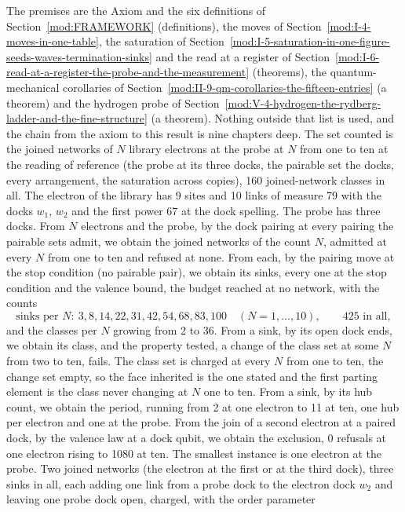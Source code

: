 \begin{chproof}[census]
The premises are the Axiom and the six definitions of Section~\ref{mod:FRAMEWORK} (definitions), the moves of Section~\ref{mod:I-4-moves-in-one-table}, the saturation of Section~\ref{mod:I-5-saturation-in-one-figure-seeds-waves-termination-sinks} and the read at a register of Section~\ref{mod:I-6-read-at-a-register-the-probe-and-the-measurement} (theorems), the quantum-mechanical corollaries of Section~\ref{mod:II-9-qm-corollaries-the-fifteen-entries} (a theorem) and the hydrogen probe of Section~\ref{mod:V-4-hydrogen-the-rydberg-ladder-and-the-fine-structure} (a theorem). Nothing outside that list is used, and the chain from the axiom to this result is nine chapters deep.
The set counted is the joined networks of $N$ library electrons at the probe at $N$ from one to ten at the reading of reference (the probe at its three docks, the pairable set the docks, every arrangement, the saturation across copies), 160 joined-network classes in all. The electron of the library has 9 sites and 10 links of measure 79 with the docks $w_1$, $w_2$ and the first power 67 at the dock spelling. The probe has three docks. From $N$ electrons and the probe, by the dock pairing at every pairing the pairable sets admit, we obtain the joined networks of the count $N$, admitted at every $N$ from one to ten and refused at none. From each, by the pairing move at the stop condition (no pairable pair), we obtain its sinks, every one at the stop condition and the valence bound, the budget reached at no network, with the counts
\begin{equation}
\text{sinks per } N: \ 3, 8, 14, 22, 31, 42, 54, 68, 83, 100 \quad (N = 1, \ldots, 10), \qquad 425 \text{ in all} ,
\end{equation}
and the classes per $N$ growing from 2 to 36. From a sink, by its open dock ends, we obtain its class, and the property tested, a change of the class set at some $N$ from two to ten, fails. The class set is charged at every $N$ from one to ten, the change set empty, so the face inherited is the one stated and the first parting element is the class never changing at $N$ one to ten. From a sink, by its hub count, we obtain the period, running from 2 at one electron to 11 at ten, one hub per electron and one at the probe. From the join of a second electron at a paired dock, by the valence law at a dock qubit, we obtain the exclusion, 0 refusals at one electron rising to 1080 at ten. The smallest instance is one electron at the probe. Two joined networks (the electron at the first or at the third dock), three sinks in all, each adding one link from a probe dock to the electron dock $w_2$ and leaving one probe dock open, charged, with the order parameter

\end{chproof}
